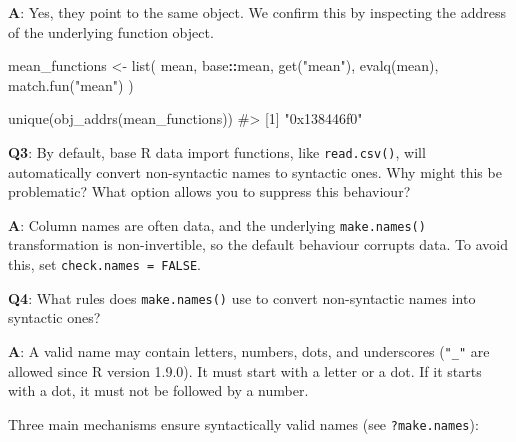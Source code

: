 \documentclass[
]{krantz}
\makeatletter
\newenvironment{Shaded}{\begin{snugshade}}{\end{snugshade}}
\newcommand{\CommentTok}[1]{\textcolor[rgb]{0.56,0.35,0.01}{\textit{#1}}}
\newcommand{\KeywordTok}[1]{\textcolor[rgb]{0.13,0.29,0.53}{\textbf{#1}}}
\newcommand{\NormalTok}[1]{#1}
\newcommand{\OperatorTok}[1]{\textcolor[rgb]{0.81,0.36,0.00}{\textbf{#1}}}
\newcommand{\StringTok}[1]{\textcolor[rgb]{0.31,0.60,0.02}{#1}}
\newenvironment{kframe}{%
\medskip{}
\setlength{\fboxsep}{.8em}
 \def\at@end@of@kframe{}%
 \ifinner\ifhmode%
  \def\at@end@of@kframe{\end{minipage}}%
  \begin{minipage}{\columnwidth}%
 \fi\fi%
 \def\FrameCommand##1{\hskip\@totalleftmargin \hskip-\fboxsep
 \colorbox{shadecolor}{##1}\hskip-\fboxsep
     \hskip-\linewidth \hskip-\@totalleftmargin \hskip\columnwidth}%
 \MakeFramed {\advance\hsize-\width
   \@totalleftmargin\z@ \linewidth\hsize
   \@setminipage}}%
 {\par\unskip\endMakeFramed%
 \at@end@of@kframe}
\renewenvironment{Shaded}{\begin{kframe}}{\end{kframe}}
\renewcommand{\KeywordTok} [1]{\textcolor[rgb]{0.00,0.44,0.13}{{#1}}}
\renewcommand{\StringTok}  [1]{\textcolor[rgb]{0.25,0.44,0.63}{{#1}}}
\renewcommand{\CommentTok} [1]{\textcolor[rgb]{0.38,0.63,0.69}{{#1}}}
\renewcommand{\NormalTok}  [1]{{#1}}
\makeatother
\begin{document}
\textbf{{A}}: Yes, they point to the same object. We confirm this by inspecting the address of the underlying function object.

\begin{Shaded}
\begin{Highlighting}[]
\NormalTok{mean_functions <-}\StringTok{ }\KeywordTok{list}\NormalTok{(}
\NormalTok{  mean,}
\NormalTok{  base}\OperatorTok{::}\NormalTok{mean,}
  \KeywordTok{get}\NormalTok{(}\StringTok{"mean"}\NormalTok{),}
  \KeywordTok{evalq}\NormalTok{(mean),}
  \KeywordTok{match.fun}\NormalTok{(}\StringTok{"mean"}\NormalTok{)}
\NormalTok{)}

\KeywordTok{unique}\NormalTok{(}\KeywordTok{obj_addrs}\NormalTok{(mean_functions))}
\CommentTok{#> [1] "0x138446f0"}
\end{Highlighting}
\end{Shaded}

\textbf{{Q3}}: By default, base R data import functions, like \texttt{read.csv()}, will automatically convert non-syntactic names to syntactic ones. Why might this be problematic? What option allows you to suppress this behaviour?

\textbf{{A}}: Column names are often data, and the underlying \texttt{make.names()} transformation is non-invertible, so the default behaviour corrupts data. To avoid this, set \texttt{check.names\ =\ FALSE}.

\textbf{{Q4}}: What rules does \texttt{make.names()} use to convert non-syntactic names into syntactic ones?

\textbf{{A}}: A valid name may contain letters, numbers, dots, and underscores (\texttt{"\_"} are allowed since R version 1.9.0). It must start with a letter or a dot. If it starts with a dot, it must not be followed by a number.

Three main mechanisms ensure syntactically valid names (see \texttt{?make.names}):
\end{document}
